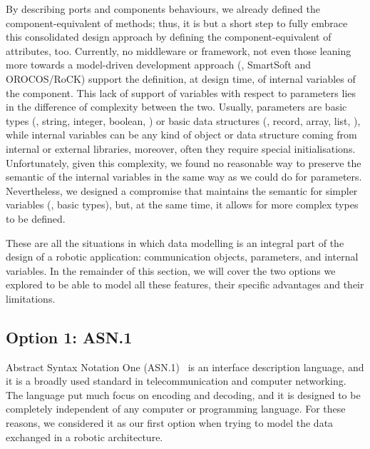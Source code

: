 By describing ports and components behaviours, we already defined the component-equivalent of methods; thus, it is but a short step to fully embrace this consolidated design approach by defining the component-equivalent of attributes, too. Currently, no middleware or framework, not even those leaning more towards a model-driven development approach (\ie, SmartSoft and OROCOS/RoCK) support the definition, at design time, of internal variables of the component. This lack of support of variables with respect to parameters lies in the difference of complexity between the two. Usually, parameters are basic types (\eg, string, integer, boolean, \etc) or basic data structures (\eg, record, array, list, \etc), while internal variables can be any kind of object or data structure coming from internal or external libraries, moreover, often they require special initialisations. Unfortunately, given this complexity, we found no reasonable way to preserve the semantic of the internal variables in the same way as we could do for parameters. Nevertheless, we designed a compromise that maintains the semantic for simpler variables (\ie, basic types), but, at the same time, it allows for more complex types to be defined.

These are all the situations in which data modelling is an integral part of the design of a robotic application: communication objects, parameters, and internal variables. In the remainder of this section, we will cover the two options we explored to be able to model all these features, their specific advantages and their limitations.

\subsection{Option 1: ASN.1}
Abstract Syntax Notation One (ASN.1)~\cite{dubuisson2000asn} is an interface description language, and it is a broadly used standard in telecommunication and computer networking. The language put much focus on encoding and decoding, and it is designed to be completely independent of any computer or programming language. For these reasons, we considered it as our first option when trying to model the data exchanged in a robotic architecture.

